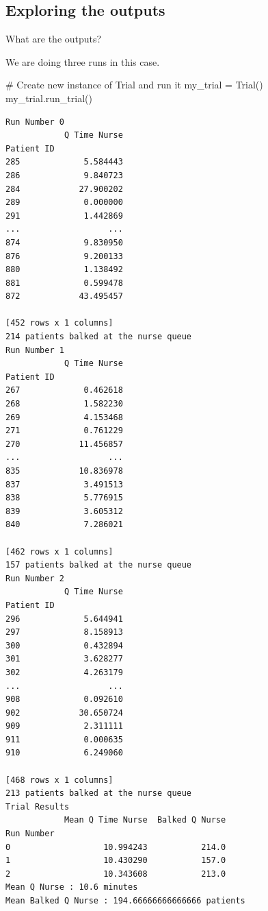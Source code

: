 \documentclass[
  letterpaper,
  DIV=11,
  numbers=noendperiod]{scrreprt}
\newenvironment{Shaded}{}{}
\newcommand{\CommentTok}[1]{\textcolor[rgb]{0.42,0.45,0.49}{#1}}
\newcommand{\NormalTok}[1]{\textcolor[rgb]{0.14,0.16,0.18}{#1}}
\newcommand{\OperatorTok}[1]{\textcolor[rgb]{0.14,0.16,0.18}{#1}}
\begin{document}
\subsection{Exploring the outputs}\label{exploring-the-outputs-1}

What are the outputs?

We are doing three runs in this case.

\begin{Shaded}
\begin{Highlighting}[]
\CommentTok{\# Create new instance of Trial and run it}
\NormalTok{my\_trial }\OperatorTok{=}\NormalTok{ Trial()}
\NormalTok{my\_trial.run\_trial()}
\end{Highlighting}
\end{Shaded}

\begin{verbatim}
Run Number 0
            Q Time Nurse
Patient ID              
285             5.584443
286             9.840723
284            27.900202
289             0.000000
291             1.442869
...                  ...
874             9.830950
876             9.200133
880             1.138492
881             0.599478
872            43.495457

[452 rows x 1 columns]
214 patients balked at the nurse queue
Run Number 1
            Q Time Nurse
Patient ID              
267             0.462618
268             1.582230
269             4.153468
271             0.761229
270            11.456857
...                  ...
835            10.836978
837             3.491513
838             5.776915
839             3.605312
840             7.286021

[462 rows x 1 columns]
157 patients balked at the nurse queue
Run Number 2
            Q Time Nurse
Patient ID              
296             5.644941
297             8.158913
300             0.432894
301             3.628277
302             4.263179
...                  ...
908             0.092610
902            30.650724
909             2.311111
911             0.000635
910             6.249060

[468 rows x 1 columns]
213 patients balked at the nurse queue
Trial Results
            Mean Q Time Nurse  Balked Q Nurse
Run Number                                   
0                   10.994243           214.0
1                   10.430290           157.0
2                   10.343608           213.0
Mean Q Nurse : 10.6 minutes
Mean Balked Q Nurse : 194.66666666666666 patients
\end{verbatim}
\end{document}
